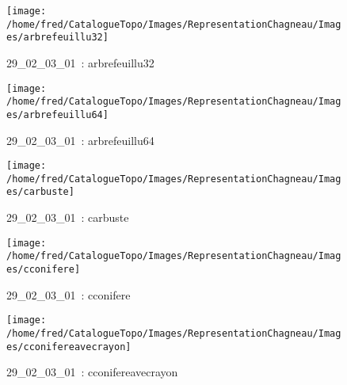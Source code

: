 \documentclass[12pt,titlepage]{book}
\begin{document}
\begin{figure}[h!]
  \hfill         %
  \begin{minipage}[t]{3cm}
    \begin{center}
      \texttt{[image: /home/fred/CatalogueTopo/Images/RepresentationChagneau/Images/arbrefeuillu32]}
      \caption[~29\_02\_03\_01]{\small{29\_02\_03\_01~:} \tiny{arbrefeuillu32}}\label{arbrefeuillu32}
    \end{center}
  \end{minipage}
  \begin{minipage}[t]{3cm}
    \begin{center}
      \texttt{[image: /home/fred/CatalogueTopo/Images/RepresentationChagneau/Images/arbrefeuillu64]}
      \caption[~29\_02\_03\_01]{\small{29\_02\_03\_01~:} \tiny{arbrefeuillu64}}\label{arbrefeuillu64}
    \end{center}
  \end{minipage}
  \begin{minipage}[t]{3cm}
    \begin{center}
      \texttt{[image: /home/fred/CatalogueTopo/Images/RepresentationChagneau/Images/carbuste]}
      \caption[~29\_02\_03\_01]{\small{29\_02\_03\_01~:} \tiny{carbuste}}\label{carbuste}
    \end{center}
  \end{minipage}
  \begin{minipage}[t]{3cm}
    \begin{center}
      \texttt{[image: /home/fred/CatalogueTopo/Images/RepresentationChagneau/Images/cconifere]}
      \caption[~29\_02\_03\_01]{\small{29\_02\_03\_01~:} \tiny{cconifere}}\label{cconifere}
    \end{center}
  \end{minipage}
  \begin{minipage}[t]{3cm}
    \begin{center}
      \texttt{[image: /home/fred/CatalogueTopo/Images/RepresentationChagneau/Images/cconifereavecrayon]}
      \caption[~29\_02\_03\_01]{\small{29\_02\_03\_01~:} \tiny{cconifereavecrayon}}\label{cconifereavecrayon}
    \end{center}
  \end{minipage}
  \begin{minipage}[t]{3cm}

\end{minipage}
\end{figure}
\end{document}

